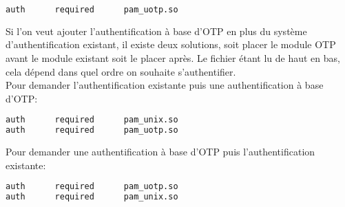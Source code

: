 \documentclass{"../../../res/univ-projet"}
\begin{document}
\begin{lstlisting}[language=bash, backgroundcolor=\color{black}, basicstyle=\color{white}]
auth      required      pam_uotp.so 
\end{lstlisting}

Si l'on veut ajouter l'authentification à base d'OTP en plus du système 
d'authentification existant, il existe deux solutions, soit placer le module OTP 
avant le module existant soit le placer après. Le fichier étant lu de haut en bas, 
cela dépend dans quel ordre on souhaite s'authentifier.\\
Pour demander l'authentification existante puis une authentification à base d'OTP: 
\begin{lstlisting}[language=bash, backgroundcolor=\color{black}, basicstyle=\color{white}]
auth      required      pam_unix.so
auth      required      pam_uotp.so
\end{lstlisting}
\newpage
Pour demander une authentification à base d'OTP puis l'authentification existante:
\begin{lstlisting}[language=bash, backgroundcolor=\color{black}, basicstyle=\color{white}]
auth      required      pam_uotp.so
auth      required      pam_unix.so
\end{lstlisting}
\end{document}
